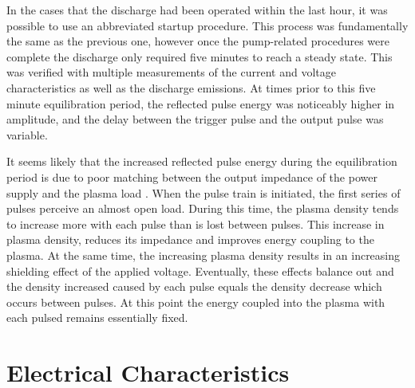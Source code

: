 In the cases that the discharge had been operated within the last hour, it was
possible to use an abbreviated startup procedure. This process was fundamentally
the same as the previous one, however once the pump-related procedures were
complete the discharge only required five minutes to reach a steady state. This
was verified with multiple measurements of the current and voltage
characteristics as well as the discharge emissions. At times prior to this five
minute equilibration period, the reflected pulse energy was noticeably higher in
amplitude, and the delay between the trigger pulse and the output pulse was
variable.

It seems likely that the increased reflected pulse energy during the
equilibration period is due to poor matching between the output impedance of the
power supply and the plasma load \cite{Pancheshnyi2006}. When the pulse train is
initiated, the first series of pulses perceive an almost open load. During this
time, the plasma density tends to increase more with each pulse than is lost
between pulses. This increase in plasma density, reduces its impedance and
improves energy coupling to the plasma. At the same time, the increasing plasma
density results in an increasing shielding effect of the applied voltage.
Eventually, these effects balance out and the density increased caused by each
pulse equals the density decrease which occurs between pulses. At this point the
energy coupled into the plasma with each pulsed remains essentially fixed.

\section{Electrical Characteristics}

